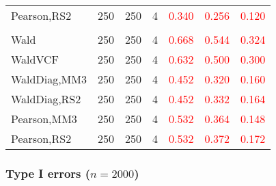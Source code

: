\documentclass[
]{article}
\begin{document}
\begin{table}[H]
{\begin{tabular}[t]{lrrrrrr}
\hspace{1em}Pearson,RS2 & 250 & 250 & 4 & \textcolor{red}{0.340} & \textcolor{red}{0.256} & \textcolor{red}{0.120}\\
\addlinespace[0.3em]
\multicolumn{7}{l}{\textbf{3F 15V}}\\
\hspace{1em}Wald & 250 & 250 & 4 & \textcolor{red}{0.668} & \textcolor{red}{0.544} & \textcolor{red}{0.324}\\
\hspace{1em}WaldVCF & 250 & 250 & 4 & \textcolor{red}{0.632} & \textcolor{red}{0.500} & \textcolor{red}{0.300}\\
\hspace{1em}WaldDiag,MM3 & 250 & 250 & 4 & \textcolor{red}{0.452} & \textcolor{red}{0.320} & \textcolor{red}{0.160}\\
\hspace{1em}WaldDiag,RS2 & 250 & 250 & 4 & \textcolor{red}{0.452} & \textcolor{red}{0.332} & \textcolor{red}{0.164}\\
\hspace{1em}Pearson,MM3 & 250 & 250 & 4 & \textcolor{red}{0.532} & \textcolor{red}{0.364} & \textcolor{red}{0.148}\\
\hspace{1em}Pearson,RS2 & 250 & 250 & 4 & \textcolor{red}{0.532} & \textcolor{red}{0.372} & \textcolor{red}{0.172}\\
\bottomrule
\end{tabular}}
\endgroup{}
\end{table}

\hypertarget{type-i-errors-n2000-1}{%
\subsubsection{\texorpdfstring{Type I errors
(\(n=2000\))}{Type I errors (n=2000)}}\label{type-i-errors-n2000-1}}
\end{document}
